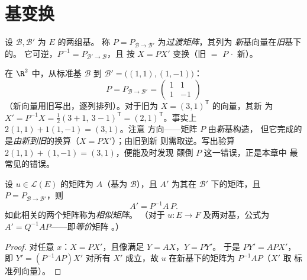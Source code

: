 \section{基变换}

\begin{definition}\label{def:b1:matrices:changeofbasis}
设 $\mathcal{B}, \mathcal{B}'$ 为 $E$ 的两组基。
称 $P =
P_{\mathcal{B}\to\mathcal{B}'}$ 为\emph{过渡矩阵}，其列为
\emph{新}基向量在\emph{旧}基下的。
它可逆，$P^{-1} = P_{\mathcal{B}'\to\mathcal{B}}$，且
按 $X = PX'$ 变换（旧 $=$ $P\,\cdot$ 新）。
\end{definition}

\begin{example}[读懂过渡矩阵]
\label{ex:b1:matrices:changerun}
在 $\R^2$ 中，从标准基 $\mathcal B$ 到 $\mathcal B' =
\bigl((1,1), (1,-1)\bigr)$：
\[
P = P_{\mathcal B\to\mathcal B'} =
\begin{pmatrix} 1 & 1\\ 1 & -1 \end{pmatrix}
\]
（新向量用旧写出，逐列排列）。对于旧为
$X = (3, 1)^{\mathsf T}$ 的向量，其新
为 $X' = P^{-1}X = \frac12(3 + 1,\ 3 - 1)^{\mathsf T} =
(2, 1)^{\mathsf T}$。事实上 $2(1,1) + 1(1,-1) = (3,1)$。注意
方向——矩阵 $P$ 由\emph{新}基构造，
但它完成的是\emph{由新到旧}的换算（$X = PX'$）；由旧到新
则需取逆。写出验算
$2(1,1) + (1,-1) = (3,1)$，便能及时发现
颠倒 $P$ 这一错误，正是本章中
最常见的错误。
\end{example}

\begin{theorem}[映射的基变换]\label{thm:b1:matrices:conjugation}
设 $u \in \mathcal{L}(E)$ 的矩阵为 $A$（基为 $\mathcal{B}$），且 $A'$
为其在 $\mathcal{B}'$ 下的矩阵，且 $P = P_{\mathcal{B}\to\mathcal{B}'}$，则
\[
A' = P^{-1} A\, P .
\]
如此相关的两个矩阵称为\emph{相似矩阵}。
（对于 $u \colon E \to F$ 及两对基，公式为
$A' = Q^{-1} A P$——即\emph{等价}矩阵
。）
\end{theorem}

\begin{proof}
对任意 $x$：$X = PX'$，且像满足 $Y = AX$，$Y = PY'$。
于是 $PY' = APX'$，即 $Y' = (P^{-1}AP)X'$ 对所有 $X'$ 成立，故
$u$ 在新基下的矩阵为 $P^{-1}AP$（$X'$ 取
标准列向量）。
\end{proof}

